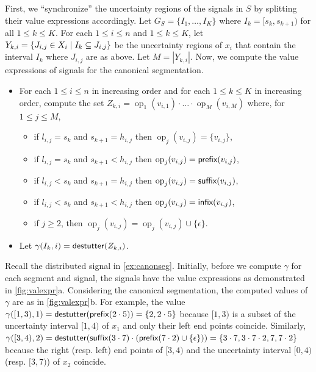 First,  we ``synchronize'' the uncertainty regions of the signals in $S$ by splitting their value expressions accordingly.
Let $G_S = \{I_1, \ldots, I_K\}$ where $I_k = [s_k, s_{k+1})$ for all $1 \leq k \leq K$.
For each $1 \leq i \leq n$ and $1 \leq k \leq K$, let $Y_{k,i} = \{ J_{i,j} \in X_i \st I_k \subseteq J_{i,j}\}$ be the uncertainty regions of $x_i$ that contain the interval $I_k$ where $J_{i,j}$ are as above.
Let $M = |Y_{k,i}|$.
Now, we compute the value expressions of signals for the canonical segmentation. 
\begin{itemize}
	\item For each $1 \leq i \leq n$ in increasing order and for each $1 \leq k \leq K$ in increasing order, compute the set $Z_{k,i} = \operatorname{op}_1(v_{i,1}) \cdot \ldots \cdot \operatorname{op}_{M}(v_{i,M})$ where, for $1 \leq j \leq M$,
	\begin{itemize}
		\item if $l_{i,j} = s_k$ and $s_{k+1} = h_{i,j}$ then $\operatorname{op}_j(v_{i,j}) = \{v_{i,j}\}$,
		\item if $l_{i,j} = s_k$ and $s_{k+1} < h_{i,j}$ then $\operatorname{op}_j(v_{i,j}) = \textsf{prefix}(v_{i,j})$,
		\item if $l_{i,j} < s_k$ and $s_{k+1} = h_{i,j}$ then $\operatorname{op}_j(v_{i,j}) = \textsf{suffix}(v_{i,j})$,
		\item if $l_{i,j} < s_k$ and $s_{k+1} < h_{i,j}$ then $\operatorname{op}_j(v_{i,j}) = \textsf{infix}(v_{i,j})$,
		\item if $j \geq 2$, then $\operatorname{op}_j(v_{i,j}) = \operatorname{op}_j(v_{i,j}) \cup \{\epsilon\}$.
	\end{itemize}
	\item Let $\gamma(I_k, i) = \mathsf{destutter}(Z_{k,i})$.
\end{itemize}

\begin{example}
	Recall the distributed signal in \cref{ex:canonseg}.
	Initially, before we compute $\gamma$ for each segment and signal, the signals have the value expressions as demonstrated in \cref{fig:valexpr}a.
	Considering the canonical segmentation, the computed values of $\gamma$ are as in \cref{fig:valexpr}b.
	For example, the value $\gamma([1,3),1) = \mathsf{destutter}(\textsf{prefix}(2 \cdot 5)) = \{2, 2 \cdot 5\}$ because $[1,3)$ is a subset of the uncertainty interval $[1,4)$ of $x_1$ and only their left end points coincide.
	Similarly, $\gamma([3,4),2) = \mathsf{destutter}(\textsf{suffix}(3 \cdot 7) \cdot (\textsf{prefix}(7 \cdot 2) \cup \{\epsilon\})) = \{3 \cdot 7, 3 \cdot 7 \cdot 2, 7, 7 \cdot 2\}$ because the right (resp. left) end points of $[3,4)$ and the uncertainty interval $[0,4)$ (resp. $[3,7)$) of $x_2$ coincide.
\end{example}

